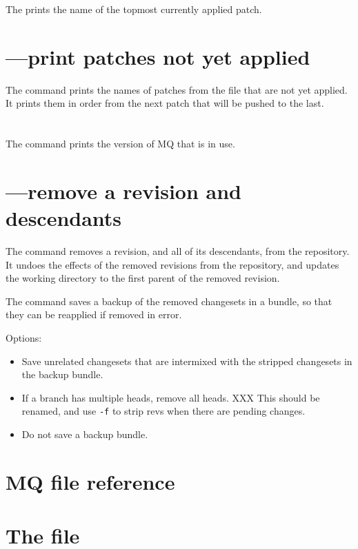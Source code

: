 The  prints the name of the topmost currently applied
patch.

\section{---print patches not yet applied}

The  command prints the names of patches from the
 file that are not yet applied.  It prints them in
order from the next patch that will be pushed to the last.

\section{}

The  command prints the version of MQ that is in use.

\section{---remove a revision and descendants}

The  command removes a revision, and all of its
descendants, from the repository.  It undoes the effects of the
removed revisions from the repository, and updates the working
directory to the first parent of the removed revision.

The  command saves a backup of the removed changesets in
a bundle, so that they can be reapplied if removed in error.

Options:
\begin{itemize}
\item[\hgopt{strip}{-b}] Save unrelated changesets that are intermixed
  with the stripped changesets in the backup bundle.
\item[\hgopt{strip}{-f}] If a branch has multiple heads, remove all
  heads. XXX This should be renamed, and use \texttt{-f} to strip revs
  when there are pending changes.
\item[\hgopt{strip}{-n}] Do not save a backup bundle.
\end{itemize}

\section{MQ file reference}

\section{The  file}


